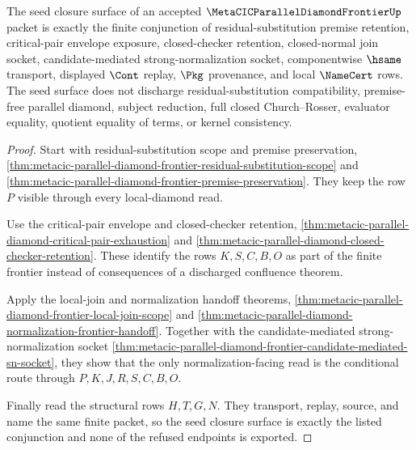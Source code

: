 \begin{theorem}
\label{thm:metacic-parallel-diamond-frontier-seed-closure-status}
The seed closure surface of an accepted $\MetaCICParallelDiamondFrontierUp$ packet is exactly the finite conjunction of residual-substitution premise retention, critical-pair envelope exposure, closed-checker retention, closed-normal join socket, candidate-mediated strong-normalization socket, componentwise $\hsame$ transport, displayed $\Cont$ replay, $\Pkg$ provenance, and local $\NameCert$ rows. The seed surface does not discharge residual-substitution compatibility, premise-free parallel diamond, subject reduction, full closed Church--Rosser, evaluator equality, quotient equality of terms, or kernel consistency.
\end{theorem}
\begin{proof}
Start with residual-substitution scope and premise preservation, \autoref{thm:metacic-parallel-diamond-frontier-residual-substitution-scope} and \autoref{thm:metacic-parallel-diamond-frontier-premise-preservation}. They keep the row $P$ visible through every local-diamond read.

Use the critical-pair envelope and closed-checker retention, \autoref{thm:metacic-parallel-diamond-critical-pair-exhaustion} and \autoref{thm:metacic-parallel-diamond-closed-checker-retention}. These identify the rows $K,S,C,B,O$ as part of the finite frontier instead of consequences of a discharged confluence theorem.

Apply the local-join and normalization handoff theorems, \autoref{thm:metacic-parallel-diamond-frontier-local-join-scope} and \autoref{thm:metacic-parallel-diamond-normalization-frontier-handoff}. Together with the candidate-mediated strong-normalization socket \autoref{thm:metacic-parallel-diamond-frontier-candidate-mediated-sn-socket}, they show that the only normalization-facing read is the conditional route through $P,K,J,R,S,C,B,O$.

Finally read the structural rows $H,T,G,N$. They transport, replay, source, and name the same finite packet, so the seed closure surface is exactly the listed conjunction and none of the refused endpoints is exported.
\end{proof}

